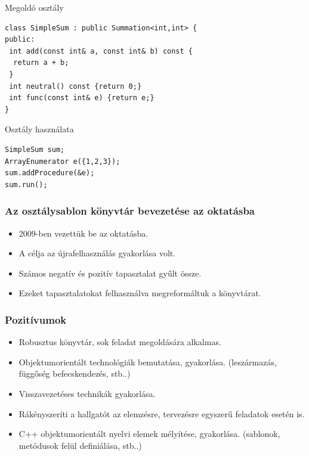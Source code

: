 \documentclass[11pt]{beamer}
\begin{document}
\begin{frame}[fragile]	
	\begin{block}{Megoldó osztály}
		\begin{lstlisting}[basicstyle=\small]
class SimpleSum : public Summation<int,int> {
public:
 int add(const int& a, const int& b) const {
  return a + b;
 }
 int neutral() const {return 0;}
 int func(const int& e) {return e;}
}
		\end{lstlisting}
	\end{block}
	
	\begin{block}{Osztály használata}
	  	\begin{lstlisting}[basicstyle=\small]
SimpleSum sum;
ArrayEnumerator e({1,2,3});
sum.addProcedure(&e);
sum.run();
		\end{lstlisting}
	\end{block}
\end{frame}

\begin{frame}
	\frametitle{Az osztálysablon könyvtár bevezetése az oktatásba}
	\begin{itemize}
		\item 2009-ben vezettük be az oktatásba.
		\vspace*{2px}
		\item A célja az újrafelhasználás gyakorlása volt.
		\vspace*{2px}
		\item Számos negatív és pozitív tapasztalat gyűlt össze.
		\vspace*{2px}
		\item Ezeket tapasztalatokat felhasználva megreformáltuk a könyvtárat.
	\end{itemize}
\end{frame}

\begin{frame}
	\frametitle{Pozitívumok}
	\begin{itemize}
		\item Robusztus könyvtár, sok feladat megoldására alkalmas.
		\item Objektumorientált technológiák bemutatása, gyakorlása. (leszármazás, függőség befecskendezés, stb..) 
		\vspace*{8px}
		\item Visszavezetéses technikák gyakorlása.
		\vspace*{8px}
		\item Rákényszeríti a hallgatót az elemzésre, tervezésre egyszerű feladatok esetén is.
		\item C++ objektumorientált nyelvi elemek mélyítése, gyakorlása. (sablonok, metódusok felül definiálása, stb..)
		
	\end{itemize}
\end{frame}
\end{document}
